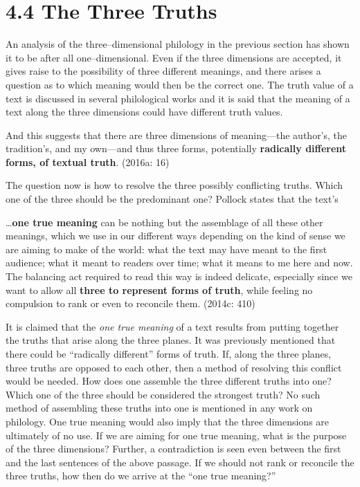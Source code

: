 \vspace{-.3cm}

\section*{4.4 The Three Truths}

An analysis of the three–dimensional philology in the previous section has shown it to be after all one–dimensional. Even if the three dimensions are accepted, it gives raise to the possibility of three different meanings, and there arises a question as to which meaning would then be the correct one. The truth value of a text is discussed in several philological works and it is said that the meaning of a text along the three dimensions could have different truth values.

\begin{myquote}
And this suggests that there are three dimensions of meaning—the author’s, the tradition’s, and my own—and thus three forms, potentially \textbf{radically different forms, of textual truth}. (2016a: 16)
\end{myquote}

The question now is how to resolve the three possibly conflicting truths. Which one of the three should be the predominant one? Pollock states that the text’s

\begin{myquote}
…\textbf{one true meaning} can be nothing but the assemblage of all these other meanings, which we use in our different ways depending on the kind of sense we are aiming to make of the world: what the text may have meant to the first audience; what it meant to readers over time; what it means to me here and now. The balancing act required to read this way is indeed delicate, especially since we want to allow all \textbf{three to represent forms of truth}, while feeling no compulsion to rank or even to reconcile them. (2014c: 410)
\end{myquote}

It is claimed that the \textit{one true meaning} of a text results from putting together the truths that arise along the three planes. It was previously mentioned that there could be “radically different” forms of truth. If, along the three planes, three truths are opposed to each other, then a method of resolving this conflict would be needed. How does one assemble the three different truths into one? Which one of the three should be considered the strongest truth? No such method of assembling these truths into one is mentioned in any work on philology. One true meaning would also imply that the three dimensions are ultimately of no use. If we are aiming for one true meaning, what is the purpose of the three dimensions? Further, a contradiction is seen even between the first and the last sentences of the above passage. If we should not rank or reconcile the three truths, how then do we arrive at the “one true meaning?”

